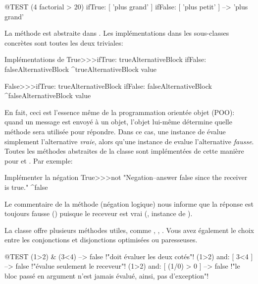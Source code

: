 \documentclass[a4paper,10pt,twoside]{book}
\begin{document}
\begin{code}{@TEST}
(4 factorial > 20) ifTrue: [ 'plus grand' ] ifFalse: [ 'plus petit' ] --> 'plus grand'
\end{code}

La m\'ethode est abstraite dans .
Les impl\'ementations dans les sous-classes concr\`etes sont toutes les deux triviales:

\begin{method}{Impl\'ementations de }
True>>>ifTrue: trueAlternativeBlock ifFalse: falseAlternativeBlock 
    ^trueAlternativeBlock value

False>>>ifTrue: trueAlternativeBlock ifFalse: falseAlternativeBlock 
    ^falseAlternativeBlock value
\end{method}

En fait, ceci est l'essence m\^eme de la programmation orient\'ee
objet (POO): quand un message est envoy\'e \`a un objet, l'objet
lui-m\^eme d\'etermine quelle m\'ethode sera utilis\'ee pour
r\'epondre. Dans ce cas, une instance de   \'evalue
simplement l'alternative \emph{vraie}, alors qu'une instance de
 evalue l'alternative \emph{fausse}. Toutes les m\'ethodes abstraites de la classe  sont impl\'ement\'ees de cette mani\`ere pour  et . Par exemple:

\begin{method}{Impl\'ementer la n\'egation}
True>>>not
    "Negation--answer false since the receiver is true."
    ^false
\end{method}

Le commentaire de la m\'ethode  (n\'egation logique) nous informe que
la r\'eponse est toujours fausse () puisque le receveur est
vrai (, instance de ).

La classe  offre plusieurs m\'ethodes utiles, comme , , . Vous avez \'egalement le choix entre les conjonctions et disjonctions optimis\'ees ou paresseuses.

\begin{code}{@TEST}
(1>2) & (3<4)              --> false    !"doit \'evaluer les deux cot\'es"!
(1>2) and: [ 3<4 ]        --> false    !"\'evalue seulement le receveur"!
(1>2) and: [ (1/0) > 0 ] --> false    !"le bloc pass\'e en argument n'est jamais \'evalu\'e, ainsi, pas d'exception"!
\end{code}
\end{document}
